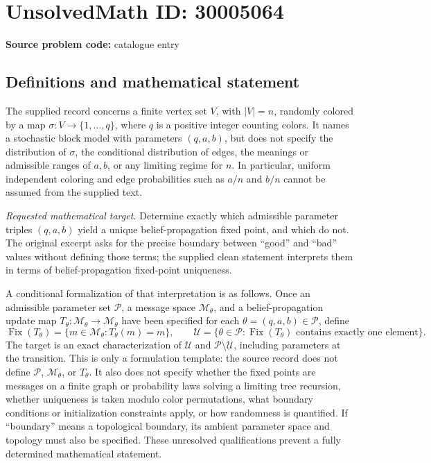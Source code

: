 \documentclass[11pt]{article}
\begin{document}
\section*{UnsolvedMath ID: 30005064}
\textbf{Source problem code:} catalogue entry
\subsection{Definitions and mathematical statement}
The supplied record concerns a finite vertex set \(V\), with \(|V|=n\), randomly colored by a map \(\sigma:V\to\{1,\ldots,q\}\), where \(q\) is a positive integer counting colors. It names a stochastic block model with parameters \((q,a,b)\), but does not specify the distribution of \(\sigma\), the conditional distribution of edges, the meanings or admissible ranges of \(a,b\), or any limiting regime for \(n\). In particular, uniform independent coloring and edge probabilities such as \(a/n\) and \(b/n\) cannot be assumed from the supplied text.

\emph{Requested mathematical target.} Determine exactly which admissible parameter triples \((q,a,b)\) yield a unique belief-propagation fixed point, and which do not. The original excerpt asks for the precise boundary between ``good'' and ``bad'' values without defining those terms; the supplied clean statement interprets them in terms of belief-propagation fixed-point uniqueness.

A conditional formalization of that interpretation is as follows. Once an admissible parameter set \(\mathcal P\), a message space \(\mathcal M_\theta\), and a belief-propagation update map \(T_\theta:\mathcal M_\theta\to\mathcal M_\theta\) have been specified for each \(\theta=(q,a,b)\in\mathcal P\), define
\[
\operatorname{Fix}(T_\theta)=\{m\in\mathcal M_\theta:T_\theta(m)=m\},\qquad
\mathcal U=\{\theta\in\mathcal P:\operatorname{Fix}(T_\theta)\text{ contains exactly one element}\}.
\]
The target is an exact characterization of \(\mathcal U\) and \(\mathcal P\setminus\mathcal U\), including parameters at the transition. This is only a formulation template: the source record does not define \(\mathcal P\), \(\mathcal M_\theta\), or \(T_\theta\). It also does not specify whether the fixed points are messages on a finite graph or probability laws solving a limiting tree recursion, whether uniqueness is taken modulo color permutations, what boundary conditions or initialization constraints apply, or how randomness is quantified. If ``boundary'' means a topological boundary, its ambient parameter space and topology must also be specified. These unresolved qualifications prevent a fully determined mathematical statement.
\end{document}
